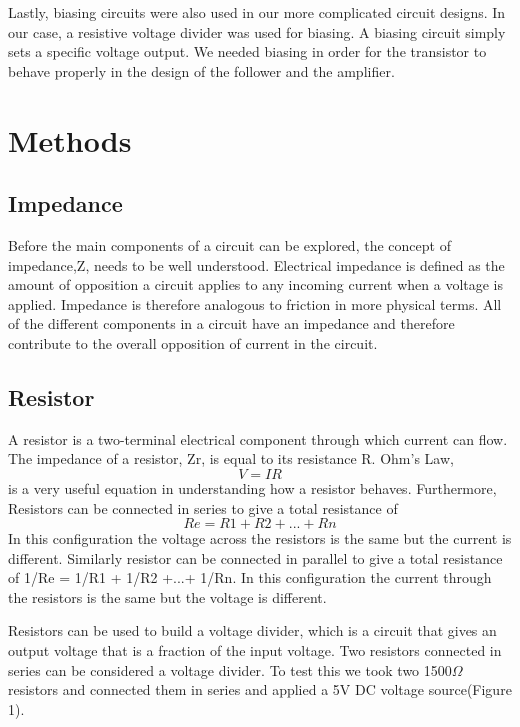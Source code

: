 \documentclass[12pt]{article}
\begin{document}
Lastly, biasing circuits were also used in our more complicated circuit
designs. In our case, a resistive voltage divider was used for
biasing. A biasing circuit simply sets a specific voltage output. We
needed biasing in order for the transistor to behave properly in the
design of the follower and the amplifier.

\section {Methods}

\subsection {Impedance}

Before the main components of a circuit can be explored, the concept of
impedance,Z, needs to be well understood. Electrical impedance is
defined as the amount of opposition a circuit applies to any incoming
current when a voltage is applied. Impedance is therefore analogous to
friction in more physical terms. All of the different components in a
circuit have an impedance and therefore contribute to the overall
opposition of current in the circuit.

\subsection {Resistor}

A resistor is a two-terminal electrical component through which current
can flow. The impedance of a resistor, Zr, is equal to its resistance
R. Ohm's Law, 
\begin {equation}
V = IR
\end {equation}
is a very useful equation in understanding how a
resistor behaves. Furthermore, Resistors can be connected in series to
give a total resistance of
\begin {equation}
Re = R1 + R2 +...+ Rn
\end {equation} 
In this configuration
the voltage across the resistors is the same but the current is
different. Similarly resistor can be connected in parallel to give a
total resistance of 1/Re = 1/R1 + 1/R2 +...+ 1/Rn. In this configuration
the current through the resistors is the same but the voltage is
different.

Resistors can be used to build a voltage divider, which is a circuit
that gives an output voltage that is a fraction of the input
voltage. Two resistors connected in series can be considered a voltage
divider. To test this we took two 1500$\Omega$ resistors and connected them in
series and applied a 5V DC voltage source(Figure 1).
\end{document}
